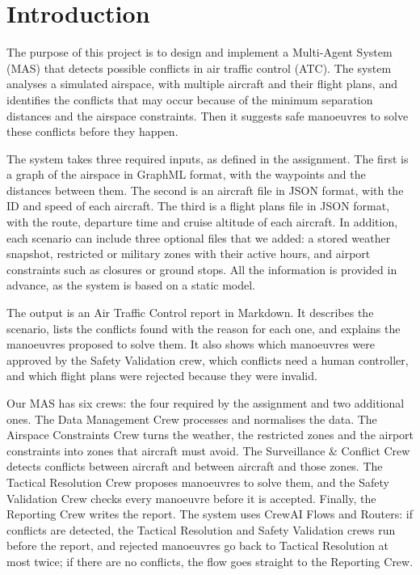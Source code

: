 \section{Introduction}

The purpose of this project is to design and implement a Multi-Agent System (MAS) that detects possible conflicts in air traffic control (ATC). The system analyses a simulated airspace, with multiple aircraft and their flight plans, and identifies the conflicts that may occur because of the minimum separation distances and the airspace constraints. Then it suggests safe manoeuvres to solve these conflicts before they happen.

The system takes three required inputs, as defined in the assignment. The first is a graph of the airspace in GraphML format, with the waypoints and the distances between them. The second is an aircraft file in JSON format, with the ID and speed of each aircraft. The third is a flight plans file in JSON format, with the route, departure time and cruise altitude of each aircraft. In addition, each scenario can include three optional files that we added: a stored weather snapshot, restricted or military zones with their active hours, and airport constraints such as closures or ground stops. All the information is provided in advance, as the system is based on a static model.

The output is an Air Traffic Control report in Markdown. It describes the scenario, lists the conflicts found with the reason for each one, and explains the manoeuvres proposed to solve them. It also shows which manoeuvres were approved by the Safety Validation crew, which conflicts need a human controller, and which flight plans were rejected because they were invalid.

Our MAS has six crews: the four required by the assignment and two additional ones. The Data Management Crew processes and normalises the data. The Airspace Constraints Crew turns the weather, the restricted zones and the airport constraints into zones that aircraft must avoid. The Surveillance \& Conflict Crew detects conflicts between aircraft and between aircraft and those zones. The Tactical Resolution Crew proposes manoeuvres to solve them, and the Safety Validation Crew checks every manoeuvre before it is accepted. Finally, the Reporting Crew writes the report. The system uses CrewAI Flows and Routers: if conflicts are detected, the Tactical Resolution and Safety Validation crews run before the report, and rejected manoeuvres go back to Tactical Resolution at most twice; if there are no conflicts, the flow goes straight to the Reporting Crew.
